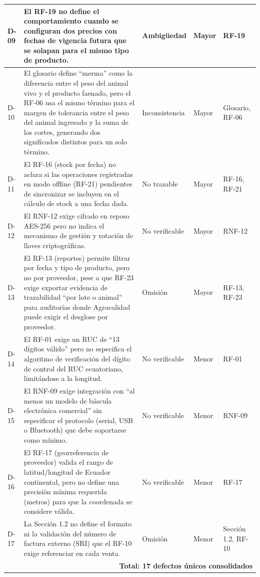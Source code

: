 \documentclass[11pt,a4paper]{article}
\begin{document}
\begin{longtable}{|p{0.8cm}|p{4.9cm}|p{2cm}|p{1.6cm}|p{2.2cm}|}
\hline
D-09 & El RF-19 no define el comportamiento cuando se configuran dos precios con fechas de vigencia futura que se solapan para el mismo tipo de producto. & Ambigüedad & Mayor & RF-19 \\
\hline
D-10 & El glosario define “merma” como la diferencia entre el peso del animal vivo y el producto faenado, pero el RF-06 usa el mismo término para el margen de tolerancia entre el peso del animal ingresado y la suma de los cortes, generando dos significados distintos para un solo término. & Inconsistencia & Mayor & Glosario, RF-06 \\
\hline
D-11 & El RF-16 (stock por fecha) no aclara si las operaciones registradas en modo offline (RF-21) pendientes de sincronizar se incluyen en el cálculo de stock a una fecha dada. & No trazable & Mayor & RF-16, RF-21 \\
\hline
D-12 & El RNF-12 exige cifrado en reposo AES-256 pero no indica el mecanismo de gestión y rotación de llaves criptográficas. & No verificable & Mayor & RNF-12 \\
\hline
D-13 & El RF-13 (reportes) permite filtrar por fecha y tipo de producto, pero no por proveedor, pese a que RF-23 exige exportar evidencia de trazabilidad “por lote o animal” para auditorías donde Agrocalidad puede exigir el desglose por proveedor. & Omisión & Mayor & RF-13, RF-23 \\
\hline
D-14 & El RF-01 exige un RUC de “13 dígitos válido” pero no especifica el algoritmo de verificación del dígito de control del RUC ecuatoriano, limitándose a la longitud. & No verificable & Menor & RF-01 \\
\hline
D-15 & El RNF-09 exige integración con “al menos un modelo de báscula electrónica comercial” sin especificar el protocolo (serial, USB o Bluetooth) que debe soportarse como mínimo. & No verificable & Menor & RNF-09 \\
\hline
D-16 & El RF-17 (georreferencia de proveedor) valida el rango de latitud/longitud de Ecuador continental, pero no define una precisión mínima requerida (metros) para que la coordenada se considere válida. & No verificable & Menor & RF-17 \\
\hline
D-17 & La Sección 1.2 no define el formato ni la validación del número de factura externo (SRI) que el RF-10 exige referenciar en cada venta. & Omisión & Menor & Sección 1.2, RF-10 \\
\hline
\multicolumn{5}{|r|}{\textbf{Total: 17 defectos únicos consolidados}} \\
\hline
\end{longtable}
\end{document}
